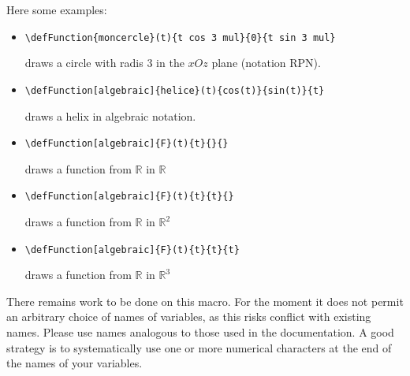 Here some examples:
\begin{itemize}
\item \verb!\defFunction{moncercle}(t){t cos 3 mul}{0}{t sin 3 mul}!

    draws a circle with radis 3 in the $xOz$ plane (notation RPN).
    \item \verb!\defFunction[algebraic]{helice}(t){cos(t)}{sin(t)}{t}!

    draws a helix in algebraic notation.
    \item \verb!\defFunction[algebraic]{F}(t){t}{}{}!

    draws a function from $\mathbb{R}$ in $\mathbb{R}$
    \item \verb!\defFunction[algebraic]{F}(t){t}{t}{}!

    draws a function from $\mathbb{R}$ in $\mathbb{R}^2$
    \item \verb!\defFunction[algebraic]{F}(t){t}{t}{t}!

    draws a function from $\mathbb{R}$ in $\mathbb{R}^3$

\end{itemize}

There remains work to be done on this macro.  For the moment it does not permit an arbitrary
choice of names of variables, as this risks conflict with existing names.  Please use
names analogous to those used in the documentation.  A good strategy is to systematically use
one or more numerical characters at the end of the names of your variables.

\endinput
